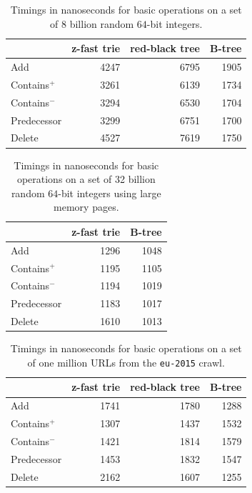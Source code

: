 \documentclass[a4paper]{article}
\newcommand{\?}{\mskip1.5mu}
\begin{document}
\begin{table}
\renewcommand{\arraystretch}{1.2}
\setlength{\tabcolsep}{10pt}
\centering
\begin{tabular}{lrrr}
&\multicolumn{1}{c}{z-fast trie}&\multicolumn{1}{c}{red-black tree}&\multicolumn{1}{c}{B-tree}\\
\hline
Add &          4247&6795&1905\\
Contains$^+$ & 3261&6139&1734\\
Contains$^-$ & 3294&6530&1704\\
Predecessor &  3299&6751&1700\\
Delete &       4527&7619&1750\\
\end{tabular}
\caption{\label{tab:intb}Timings in nanoseconds for basic operations on a set of 8 billion random $64$-bit integers.}
\end{table}


\begin{table}
\renewcommand{\arraystretch}{1.2}
\setlength{\tabcolsep}{10pt}
\centering
\begin{tabular}{lrr}
&\multicolumn{1}{c}{z-fast trie}&\multicolumn{1}{c}{B-tree}\\
\hline
Add &          1296&1048\\
Contains$^+$ & 1195&1105\\
Contains$^-$ & 1194&1019\\
Predecessor &  1183&1017\\
Delete &       1610&1013\\
\end{tabular}
\caption{\label{tab:intbb}Timings in nanoseconds for basic operations on a set of 32 billion random $64$-bit integers using large memory pages.}
\end{table}


\begin{table}
\renewcommand{\arraystretch}{1.2}
\setlength{\tabcolsep}{10pt}
\centering
\begin{tabular}{lrrr}
&\multicolumn{1}{c}{z-fast trie}&\multicolumn{1}{c}{red-black tree}&\multicolumn{1}{c}{B-tree}\\
\hline
Add &          1741&1780&1288\\
Contains$^+$ & 1307&1437&1532\\
Contains$^-$ & 1421&1814&1579\\
Predecessor &  1453&1832&1547\\
Delete &       2162&1607&1255\\
\end{tabular}
\caption{\label{tab:urlsm}Timings in nanoseconds for basic operations on a set of one million URLs from
the \texttt{eu-2015} crawl.}
\end{table}
\end{document}
